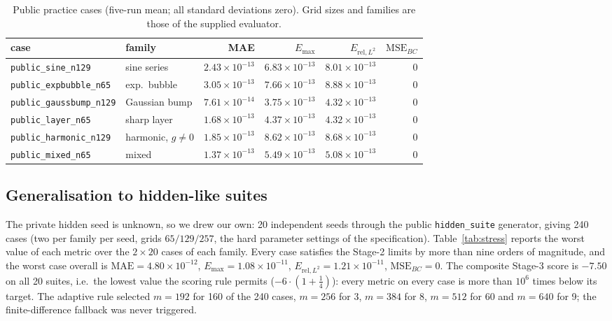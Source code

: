 \documentclass[10pt,a4paper]{article}
\newcommand{\nSeeds}{20}
\newcommand{\nCases}{240}
\newcommand{\wMae}{4.80\times10^{-12}}
\newcommand{\wMax}{1.08\times10^{-11}}
\newcommand{\wRel}{1.21\times10^{-11}}
\newcommand{\wBc}{0}
\newcommand{\sComp}{-7.50}
\begin{document}
\begin{table}[h]
\centering
\caption{Public practice cases (five-run mean; all standard deviations zero).
Grid sizes and families are those of the supplied evaluator.}
\label{tab:public}
\footnotesize
\begin{tabular}{llrrrr}
\toprule
case & family & MAE & $E_{\max}$ & $E_{\mathrm{rel},L^2}$ & $\mathrm{MSE}_{BC}$ \\
\midrule
\texttt{public\_sine\_n129} & sine series & $2.43\times10^{-13}$ & $6.83\times10^{-13}$ & $8.01\times10^{-13}$ & $0$ \\
\texttt{public\_expbubble\_n65} & exp.\ bubble & $3.05\times10^{-13}$ & $7.66\times10^{-13}$ & $8.88\times10^{-13}$ & $0$ \\
\texttt{public\_gaussbump\_n129} & Gaussian bump & $7.61\times10^{-14}$ & $3.75\times10^{-13}$ & $4.32\times10^{-13}$ & $0$ \\
\texttt{public\_layer\_n65} & sharp layer & $1.68\times10^{-13}$ & $4.37\times10^{-13}$ & $4.32\times10^{-13}$ & $0$ \\
\texttt{public\_harmonic\_n129} & harmonic, $g\neq0$ & $1.85\times10^{-13}$ & $8.62\times10^{-13}$ & $8.68\times10^{-13}$ & $0$ \\
\texttt{public\_mixed\_n65} & mixed & $1.37\times10^{-13}$ & $5.49\times10^{-13}$ & $5.08\times10^{-13}$ & $0$ \\
\bottomrule
\end{tabular}
\end{table}

\subsection{Generalisation to hidden-like suites}
The private hidden seed is unknown, so we drew our own: \nSeeds{} independent
seeds through the public \texttt{hidden\_suite} generator, giving \nCases{}
cases (two per family per seed, grids $65/129/257$, the hard parameter settings
of the specification).  Table~\ref{tab:stress} reports the worst value of each
metric over the $2\times\nSeeds$ cases of each family.  Every case satisfies the
Stage-2 limits by more than nine orders of magnitude, and the worst case overall
is $\mathrm{MAE}=\wMae$, $E_{\max}=\wMax$, $E_{\mathrm{rel},L^2}=\wRel$,
$\mathrm{MSE}_{BC}=\wBc$.  The composite Stage-3 score is $\sComp$ on all
\nSeeds{} suites, i.e.\ the lowest value the scoring rule permits
($-6\cdot(1+\tfrac14)$): every metric on every case is more than $10^6$ times
below its target.  The adaptive rule selected $m=192$ for 160 of the \nCases{}
cases, $m=256$ for 3, $m=384$ for 8, $m=512$ for 60 and $m=640$ for 9; the
finite-difference fallback was never triggered.
\end{document}
